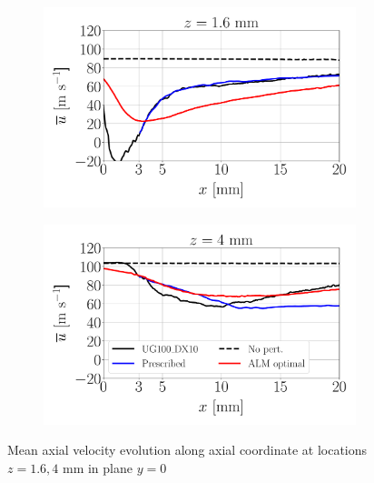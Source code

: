 \begin{figure}[ht]
\flushleft
\begin{subfigure}[b]{0.45\textwidth}
	\centering
   \includegraphics[scale=0.25]{./part2_developments/figures_ch6_lagrangian_JICF/gas_field_initial_conditions/custom_line_y0_along_x_z01p6}
\end{subfigure}
\hspace{0.4in}
\begin{subfigure}[b]{0.45\textwidth}
	\centering
   \includegraphics[scale=0.25]{./part2_developments/figures_ch6_lagrangian_JICF/gas_field_initial_conditions/custom_line_y0_along_x_z04p0}
\end{subfigure}
\caption{Mean axial velocity evolution along axial coordinate at locations $z = 1.6, 4$ mm in plane $y = 0$}
\label{fig:JICF_ICS_custom_lines_y0_along_x_ux_mean}
\end{figure}

